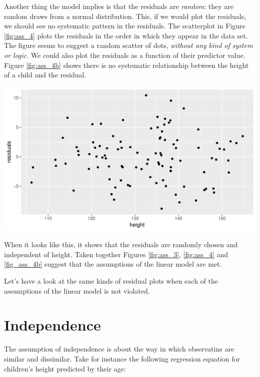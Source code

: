 \documentclass[]{report}\usepackage[]{graphicx}\usepackage[]{color}
\makeatletter
\def\maxwidth{ %
  \ifdim\Gin@nat@width>\linewidth
    \linewidth
  \else
    \Gin@nat@width
  \fi
}
\newenvironment{knitrout}{}{} %
\makeatother
\begin{document}
Another thing the model implies is that the residuals are \textit{random}: they are random draws from a normal distribution. This, if we would plot the residuals, we should see no systematic pattern in the residuals. The scatterplot in Figure \ref{fig:ass_4} plots the residuals in the order in which they appear in the data set. The figure seems to suggest a random scatter of dots, \textit{without any kind of system or logic}. We could also plot the residuals as a function of their predictor value. Figure \ref{fig:ass_4b} shows there is no systematic relationship between the height of a child and the residual.  

\begin{knitrout}
\color{fgcolor}

{\centering \includegraphics[width=\maxwidth]{figure/ass_4b-1} 

}



\end{knitrout}


When it looks like this, it shows that the residuals are randomly chosen and independent of height. Taken together Figures \ref{fig:ass_3}, \ref{fig:ass_4} and \ref{fig_ass_4b} suggest that the assumptions of the linear model are met. 

Let's have a look at the same kinds of residual plots when each of the assumptions of the linear model is not violated.

\section{Independence}
The assumption of independence is about the way in which observatins are similar and dissimilar. Take for instance the following regression equation for children's height predicted by their age:
\end{document}

